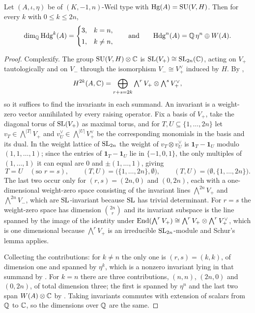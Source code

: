 \begin{theorem}\label{thm:hdgcount}
Let $(A,\iota,\eta)$ be of $(K,-1,n)$-Weil type with
$\operatorname{Hg}(A)=\operatorname{SU}(V,H)$. Then for every $k$ with $0\le k\le 2n$,
\[
  \dim_{\mathbb{Q}}\mathrm{Hdg}^{k}(A)=
  \begin{cases}
    3, & k=n,\\[2pt]
    1, & k\ne n,
  \end{cases}
  \qquad\text{and}\qquad
  \mathrm{Hdg}^{n}(A)=\mathbb{Q}\,\eta^{n}\oplus W(A).
\]
\end{theorem}

\begin{proof}
Complexify. The group $\operatorname{SU}(V,H)\otimes\mathbb{C}$ is $\operatorname{SL}(V_{+})\cong\operatorname{SL}_{2n}(\mathbb{C})$,
acting on $V_{+}$ tautologically and on $V_{-}$ through the isomorphism
$V_{-}\cong V_{+}^{\vee}$ induced by $H$. By ,
\[
  H^{2k}(A,\mathbb{C})=\bigoplus_{r+s=2k}
    \textstyle\bigwedge^{r}V_{+}\otimes\bigwedge^{s}V_{+}^{\vee},
\]
so it suffices to find the invariants in each summand. An invariant is a
weight-zero vector annihilated by every raising operator. Fix a basis of
$V_{+}$, take the diagonal torus of $\operatorname{SL}(V_{+})$ as maximal torus, and for
$T,U\subseteq\{1,\dots,2n\}$ let $v_{T}\in\bigwedge^{|T|}V_{+}$ and
$v_{U}^{\vee}\in\bigwedge^{|U|}V_{+}^{\vee}$ be the corresponding monomials in
the basis and its dual. In the weight lattice of $\operatorname{SL}_{2n}$ the weight of
$v_{T}\otimes v_{U}^{\vee}$ is
$\mathbf{1}_{T}-\mathbf{1}_{U}$ modulo $(1,1,\dots,1)$; since the entries of
$\mathbf{1}_{T}-\mathbf{1}_{U}$ lie in $\{-1,0,1\}$, the only multiples of
$(1,\dots,1)$ it can equal are $0$ and $\pm(1,\dots,1)$, giving
\[
  T=U \quad(\text{so } r=s),
  \qquad
  (T,U)=\bigl(\{1,\dots,2n\},\emptyset\bigr),
  \qquad
  (T,U)=\bigl(\emptyset,\{1,\dots,2n\}\bigr).
\]
The last two occur only for $(r,s)=(2n,0)$ and $(0,2n)$, each with a
one-dimensional weight-zero space consisting of the invariant lines
$\bigwedge^{2n}V_{+}$ and $\bigwedge^{2n}V_{-}$, which are $\operatorname{SL}$-invariant
because $\operatorname{SL}$ has trivial determinant. For $r=s$ the weight-zero space has
dimension $\binom{2n}{r}$ and its invariant subspace is the line spanned by the
image of the identity under
$\operatorname{End}(\bigwedge^{r}V_{+})\cong\bigwedge^{r}V_{+}\otimes\bigwedge^{r}V_{+}^{\vee}$,
which is one dimensional because $\bigwedge^{r}V_{+}$ is an irreducible
$\operatorname{SL}_{2n}$-module and Schur's lemma applies.

Collecting the contributions: for $k\ne n$ the only one is $(r,s)=(k,k)$, of
dimension one and spanned by $\eta^{k}$, which is a nonzero invariant lying in
that summand by . For $k=n$ there are three contributions,
$(n,n)$, $(2n,0)$ and $(0,2n)$, of total dimension three; the first is spanned
by $\eta^{n}$ and the last two span $W(A)\otimes\mathbb{C}$ by .
Taking invariants commutes with extension of scalars from $\mathbb{Q}$ to $\mathbb{C}$, so
the dimensions over $\mathbb{Q}$ are the same.
\end{proof}

